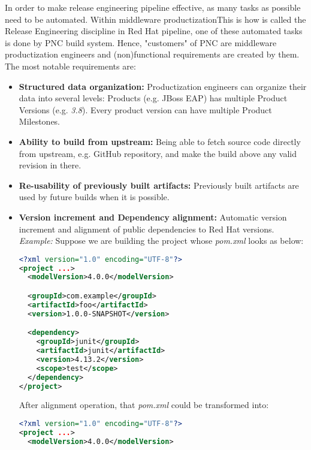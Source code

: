 \documentclass[../main.tex]{subfiles}
\begin{document}
In order to make release engineering pipeline effective, as many tasks as possible need to be automated. Within middleware productization{This is how is called the Release Engineering discipline in Red Hat} pipeline, one of these automated tasks is done by PNC build system. Hence, "customers" of PNC are middleware productization engineers and (non)functional requirements are created by them. The most notable requirements are:

\begin{itemize}
  \item \textbf{Structured data organization:} Productization engineers can
organize their data into several levels: Products (e.g. JBoss EAP) has multiple Product Versions (e.g. \textit{3.8}). Every product version can have multiple Product Milestones.

  \item \textbf{Ability to build from upstream:} Being able to fetch source code directly from upstream, e.g. GitHub repository, and make the build above any valid revision in there.

  \item \textbf{Re-usability of previously built artifacts:} Previously built artifacts are used by future builds when it is possible.

  \item \textbf{Version increment and Dependency alignment:} Automatic version increment and  alignment of public dependencies to Red Hat versions.\\
  \textit{Example:} Suppose we are building the project whose \textit{pom.xml} looks as below:

\begin{lstlisting}[language=XML, caption=Original pom.xml]
<?xml version="1.0" encoding="UTF-8"?>
<project ...>
  <modelVersion>4.0.0</modelVersion>

  <groupId>com.example</groupId>
  <artifactId>foo</artifactId>
  <version>1.0.0-SNAPSHOT</version>

  <dependency>
    <groupId>junit</groupId>
    <artifactId>junit</artifactId>
    <version>4.13.2</version>
    <scope>test</scope>
  </dependency>
</project>
\end{lstlisting}

After alignment operation, that \textit{pom.xml} could be transformed into:
\begin{lstlisting}[language=XML, caption=Same pom.xml after alignment operation]
<?xml version="1.0" encoding="UTF-8"?>
<project ...>
  <modelVersion>4.0.0</modelVersion>


\end{lstlisting}
\end{itemize}
\end{document}
